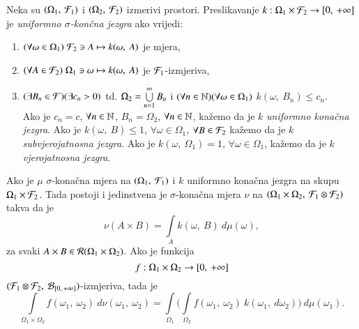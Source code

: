 \begin{defn}    \label{defn:4.17}
    Neka su $({\Omega_1}, \: {\mathcal{F}_1})$ i $({\Omega_2}, \: {\mathcal{F}_2})$ izmerivi prostori. Preslikavanje $k : \Omega_1 \times \mathcal{F}_2 \to [{0}, \:{+\infty}]$ je \emph{uniformno $\sigma$-kon\v cna jezgra} ako vrijedi:
    \begin{enumerate}[label=(\alph*)]
        \item $(\forall \omega \in \Omega_1 ) \; \mathcal{F}_2 \ni A \mapsto k(\omega, \: A)$ je mjera,
        \item $(\forall A \in \mathcal{F}_2 ) \; \Omega_1 \ni \omega \mapsto k(\omega, \: A)$ je $\mathcal{F}_1$-izmjeriva,
        \item $(\exists B_n \in \mathcal{F})(\exists c_n > 0) $ td. $ \Omega_2 = \bigcup\limits_{n = 1}^{\infty} B_n$ i $(\forall n \in \mathbb{N})(\forall \omega \in \Omega_1)$ $k(\omega, \: B_n) \leq c_n$.\\
        Ako je $c_n = c$, $\forall n \in \mathbb{N}$, $B_n = \Omega_2$, $\forall n \in \mathbb{N}$, ka\v zemo da je $k$ \emph{uniformno kona\v cna jezgra}. Ako je $k(\omega, \: B) \leq 1$, $\forall \omega \in \Omega_1$, $\forall B \in \mathcal{F}_2$ ka\v zemo da je $k$ \emph{subvjerojatnosna jezgra}. Ako je $k(\omega, \: \Omega_1) = 1$, $\forall \omega \in \Omega_1$, ka\v zemo da je $k$ \emph{vjerojatnosna jezgra}.
    \end{enumerate}
\end{defn}

\begin{zad} \label{zad:4.18}
    Ako je $\mu$ $\sigma$-kona\v cna mjera na $({\Omega_1}, \: {\mathcal{F}_1})$ i $k$ uniformno kona\v cna jezgra na skupu $\Omega_1 \times \mathcal{F}_2$.
    Tada postoji i jedinstvena je $\sigma$-kona\v cna mjera $\nu$ na $({\Omega_1 \times \Omega_2}, \: {\mathcal{F}_1 \otimes \mathcal{F}_2})$ takva da je
    \begin{equation*}
        \nu (A \times B) = \int\limits_A k(\omega, \: B) \: d \mu (\omega),
    \end{equation*}
    za svaki $A \times B \in \mathcal{R}({\Omega_1 \times \Omega_2})$.
    Ako je funkcija
    \begin{equation*}
        f:\Omega_1 \times \Omega_2 \to [{0}, \:{+\infty}]
    \end{equation*}
    $({\mathcal{F}_1 \otimes \mathcal{F}_2}, \: {\mathcal{B}_{[{0}, \:{+\infty}]}})$-izmjeriva, tada je
    \begin{equation*}
        \int\limits_{\Omega_1 \times \Omega_2} f(\omega_1, \: \omega_2) \: d \nu (\omega_1, \: \omega_2) = \int\limits_{\Omega_1} \Big( \int\limits_{\Omega_2} f(\omega_1, \: \omega_2) \: k(\omega_1, \: d \omega_2) \Big) \: d \mu (\omega_1).
    \end{equation*}
\end{zad}

